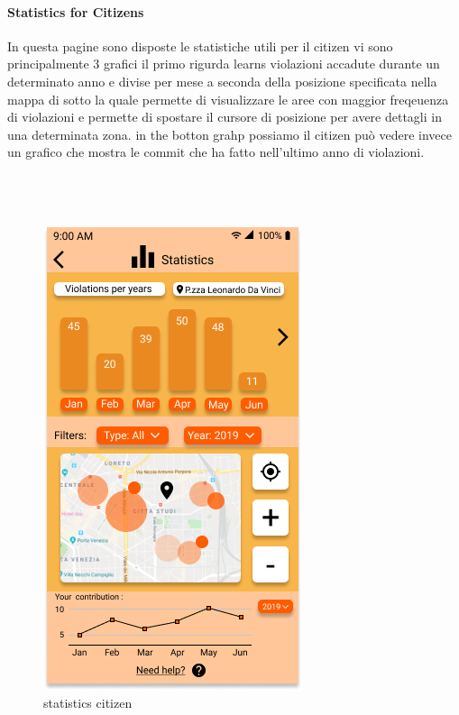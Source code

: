\documentclass{article}
\begin{document}
\paragraph{Statistics for Citizens}
In questa pagine sono disposte le statistiche utili per il citizen vi sono principalmente 3 grafici il primo rigurda learns
violazioni accadute durante un determinato anno e divise per mese a seconda della posizione specificata nella mappa di sotto
la quale permette di visualizzare le aree con maggior freqeuenza di violazioni e permette di spostare il cursore di posizione
per avere dettagli in una determinata zona. in the botton grahp possiamo il citizen può vedere invece un grafico che mostra
le commit che ha fatto nell'ultimo anno di violazioni.
\\
\\
\\
\\
\begin{figure}[H]
    \centering
    \includegraphics[scale=0.5]{img/mockups/statistics_citizen.png}
    \caption{statistics citizen}
\end{figure}

\clearpage
\end{document}
